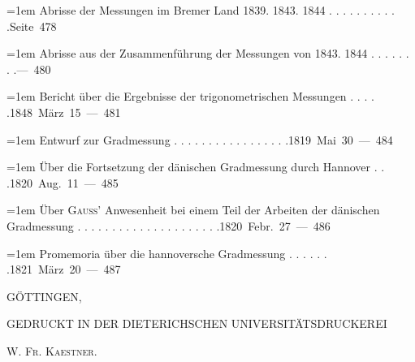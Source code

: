 \par{}%
\begingroup\fontsize{10.5}{13}\selectfont{}
\par\noindent\hangindent=1em Abrisse der Messungen im Bremer Land 1839. 1843. 1844 . . . . . . . . . . .\hfill{}\hbox{}\nobreak\hfill\mbox{Seite 478}\par
\par\noindent\hangindent=1em Abrisse aus der Zusammenführung der Messungen von 1843. 1844 . . . . . . . .\hfill{}\hbox{}\nobreak\hfill\mbox{— 480}\par
\par\noindent\hangindent=1em Bericht über die Ergebnisse der trigonometrischen Messungen . . . . .\hfill{}\hbox{}\nobreak\hfill\mbox{1848 März 15 — 481}\par
\par\noindent\hangindent=1em Entwurf zur Gradmessung . . . . . . . . . . . . . . . . .\hfill{}\hbox{}\nobreak\hfill\mbox{1819 Mai 30 — 484}\par
\par\noindent\hangindent=1em Über die Fortsetzung der dänischen Gradmessung durch Hannover . . .\hfill{}\hbox{}\nobreak\hfill\mbox{1820 Aug. 11 — 485}\par
\par\noindent\hangindent=1em Über \textsc{Gauss}’ Anwesenheit bei einem Teil der Arbeiten der dänischen Gradmessung . . . . . . . . . . . . . . . . . . . . .\hfill{}\hbox{}\nobreak\hfill\mbox{1820 Febr. 27 — 486}\par
\par\noindent\hangindent=1em Promemoria über die hannoversche Gradmessung . . . . . . .\hfill{}\hbox{}\nobreak\hfill\mbox{1821 März 20 — 487}\par
\endgroup
\par\bigskip{}\begin{center}GÖTTINGEN,\par\medskip GEDRUCKT IN DER DIETERICHSCHEN UNIVERSITÄTSDRUCKEREI\par\medskip\textsc{W. Fr. Kaestner.}\end{center}
